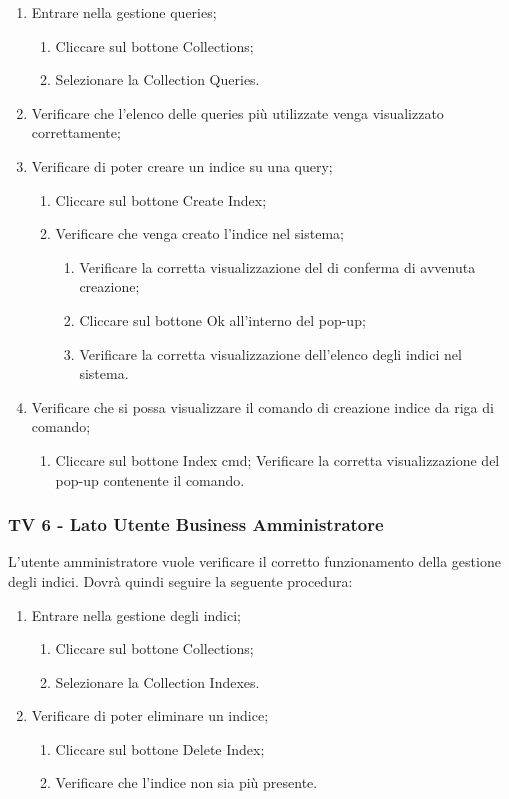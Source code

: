 \begin{enumerate}
\item Entrare nella gestione queries;
\begin{enumerate}
\item Cliccare sul bottone Collections;
\item Selezionare la Collection Queries.
\end{enumerate}
\item Verificare che l'elenco delle queries più utilizzate venga visualizzato correttamente;
\item Verificare di poter creare un indice su una query;
\begin{enumerate}
\item Cliccare sul bottone Create Index;
\item Verificare che venga creato l'indice nel sistema;
\begin{enumerate}
\item Verificare la corretta visualizzazione del  di conferma di avvenuta creazione;
\item Cliccare sul bottone Ok all'interno del pop-up;
\item Verificare la corretta visualizzazione dell'elenco degli indici nel sistema.
\end{enumerate}
\end{enumerate}
\item Verificare che si possa visualizzare il comando di creazione indice da riga di comando;
\begin{enumerate}
\item Cliccare sul bottone Index cmd;
Verificare la corretta visualizzazione del pop-up contenente il comando.
\end{enumerate}

\end{enumerate}
\subsubsection{TV 6 - Lato Utente Business Amministratore}

L’utente amministratore vuole verificare il corretto funzionamento della gestione degli indici.
Dovrà quindi seguire la seguente procedura:

\begin{enumerate}
\item Entrare nella gestione degli indici;
\begin{enumerate}
\item Cliccare sul bottone Collections;
\item Selezionare la Collection Indexes.
\end{enumerate}
\item Verificare di poter eliminare un indice;
\begin{enumerate}
\item Cliccare sul bottone Delete Index;
\item Verificare che l'indice non sia più presente.
\end{enumerate}
\end{enumerate}

